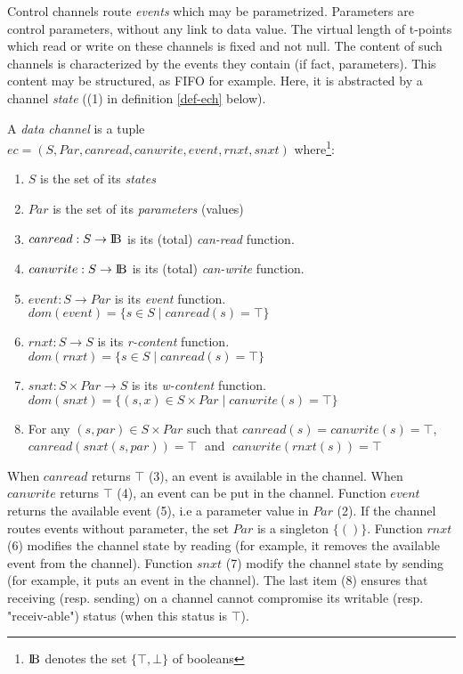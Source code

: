 \documentclass{article}
\newcommand{\BOOL}{\mbox{\normalfont I$\!$B}}
\begin{document}
Control channels route {\em events} which may be parametrized. Parameters are control parameters, without any link to data value. The virtual length of t-points which read or write on these channels is fixed and not null. The content of such channels is characterized by the events they contain (if fact, parameters). This content may be structured, as FIFO for example. Here, it is abstracted by a channel {\em state} ((1) in definition \ref{def-ech} below).
\begin{definition}\label{def-ech} A {\em data channel} is a tuple\\
$ec=(S,Par,canread,canwrite,event,rnxt,snxt)$ where\footnote{$\BOOL$ denotes the set $\{\top,\bot\}$ of booleans}:
\begin{enumerate}
\item $S$ is the set of its {\em states}
\item $Par$ is the set of its {\em parameters} (values)
\item $canread:S\rightarrow\BOOL$ is its (total) {\em can-read} function.
\item $canwrite:S\rightarrow\BOOL$ is its (total) {\em can-write} function.
\item $event:S\rightarrow Par$ is its {\em event} function.\\
      $dom(event)=\{s\in S\mid canread(s)=\top\}$
\item $rnxt: S\rightarrow S$ is its {\em r-content} function.\\
      $dom(rnxt)=\{s\in S\mid canread(s)=\top\}$
\item $snxt:S\times Par\rightarrow S$ is its {\em w-content} function.\\
      $dom(snxt)=\{(s,x)\in S\times Par\mid canwrite(s)=\top\}$
\item For any $(s,par)\in S\times Par$ such that $canread(s)=canwrite(s)=\top$,\\
      $canread(snxt(s,par))=\top\;$ and $\;canwrite(rnxt(s))=\top$  

\end{enumerate}
\end{definition}
When $canread$ returns $\top$ (3), an event is available in the channel. When $canwrite$ returns $\top$ (4), an event can be put in the channel. Function $event$ returns the available event (5), i.e a parameter value in $Par$ (2). If the channel routes events without parameter, the set $Par$ is a singleton $\{()\}$. Function $rnxt$ (6) modifies the channel state by reading (for example, it removes the available event from the channel). Function $snxt$ (7) modify the channel state by sending (for example, it puts an event in the channel).  The last item (8) ensures that receiving (resp. sending) on a channel cannot compromise its writable (resp. "receiv-able") status (when this status is $\top$).
\end{document}
